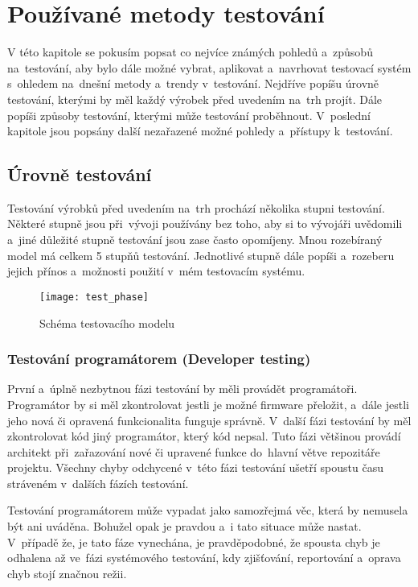\chapter{Používané metody testování}
V této kapitole se pokusím popsat co nejvíce známých pohledů a~způsobů na~testování, aby bylo dále možné vybrat, aplikovat a~navrhovat testovací systém s~ohledem na~dnešní metody a~trendy v~testování. Nejdříve popíšu úrovně testování, kterými by měl každý výrobek před uvedením na~trh projít. Dále popíši způsoby  testování, kterými může testování proběhnout. V~poslední kapitole jsou popsány další nezařazené možné pohledy a~přístupy k~testování.

\section{Úrovně testování}
Testování výrobků před uvedením na~trh prochází několika stupni testování. Některé stupně jsou při~vývoji používány bez toho, aby si to vývojáři uvědomili a~jiné důležité stupně testování jsou zase často opomíjeny. Mnou rozebíraný model má celkem 5 stupňů testování. Jednotlivé stupně dále popíši a~rozeberu jejich přínos a~možnosti použití v~mém testovacím systému.

\begin{figure}[h]
  \centering
  \texttt{[image: test\_phase]}
  \caption{Schéma testovacího modelu}
  \label{fig:test_phase}
\end{figure}

\subsection{Testování programátorem (Developer testing)}
První a~úplně nezbytnou fázi testování by měli provádět programátoři. Programátor by si měl zkontrolovat jestli je možné firmware přeložit, a~dále jestli jeho nová či opravená funkcionalita funguje správně. V~další fázi testování by měl zkontrolovat kód jiný programátor, který kód nepsal. Tuto fázi většinou provádí architekt při~zařazování nové či upravené funkce do~hlavní větve repozitáře projektu. Všechny chyby odchycené v~této fázi testování ušetří spoustu času stráveném v~dalších fázích testování.

Testování programátorem může vypadat jako samozřejmá věc, která by nemusela být ani uváděna. Bohužel opak je pravdou a~i tato situace může nastat. V~případě že, je tato fáze vynechána, je pravděpodobné, že spousta chyb je odhalena až ve~fázi systémového testování, kdy zjišťování, reportování a~oprava chyb stojí značnou režii.


